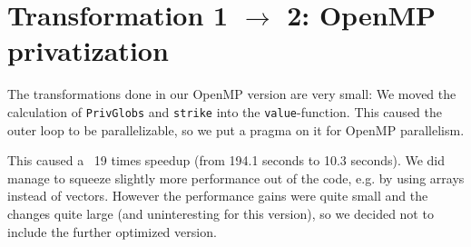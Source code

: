 \section{Transformation 1 $\rightarrow$ 2: OpenMP privatization}

The transformations done in our OpenMP version are very small: We
moved the calculation of \texttt{PrivGlobs} and \texttt{strike} into
the \texttt{value}-function. This caused the outer loop to be
parallelizable, so we put a pragma on it for OpenMP parallelism.

This caused a ~19 times speedup (from 194.1 seconds to 10.3 seconds).
We did manage to squeeze slightly more performance out of the code,
e.g. by using arrays instead of vectors. However the performance gains
were quite small and the changes quite large (and uninteresting for this
version), so we decided not to include the further optimized version.